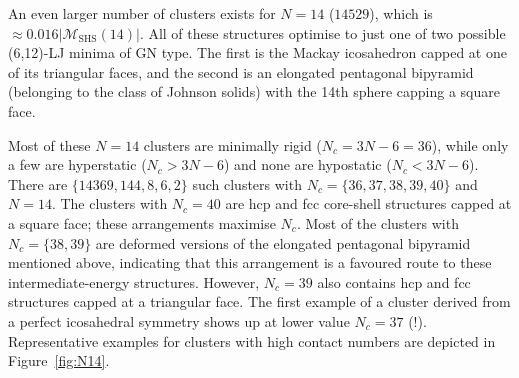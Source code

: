 An even larger number of clusters exists for $N=14$ ($14529$), which is
$\approx 0.016|\mathcal{M}_\mathrm{SHS}(14)|$. All of these structures optimise
to just one of two possible (6,12)-LJ minima of \ac{GN} type. The first is the
Mackay icosahedron capped at one of its triangular faces, and the second is an
elongated pentagonal bipyramid (belonging to the class of Johnson solids) with
the 14th sphere capping a square face.

Most of these $N=14$ clusters are minimally rigid ($N_c=3N-6=36$), while only a
few are hyperstatic ($N_c > 3N-6$) and none are hypostatic ($N_c < 3N-6$).
There are $\{14369,144,8,6,2\}$ such clusters with $N_c=\{36,37,38,39,40\}$ and
$N=14$.  The clusters with $N_c=40$ are hcp and \ac{fcc} core-shell structures
capped at a square face; these arrangements maximise $N_c$. Most of the
clusters with $N_c=\{38,39\}$ are deformed versions of the elongated pentagonal
bipyramid mentioned above, indicating that this arrangement is a favoured route
to these intermediate-energy structures.  However, $N_c=39$ also contains hcp
and \ac{fcc} structures capped at a triangular face.  The first example of a cluster
derived from a perfect icosahedral symmetry shows up at lower value $N_c=37$
(!).  Representative examples for clusters with high contact numbers are
depicted in Figure~\ref{fig:N14}.  

